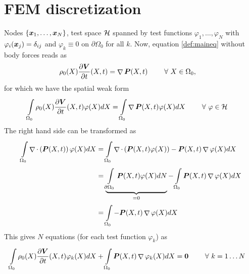 \documentclass[a4paper,12pt]{article}
\newcommand{\Or}{\Omega_0}
\newcommand{\intor}{\intl{\Or}{}}
\newcommand{\intorb}{\intl{\partial\Or}{}}
\DeclareMathOperator{\divergence}{\nabla}
\renewcommand{\div}[1]{\divergence\cdot\left(#1\right)}
\begin{document}
\section{FEM discretization}
Nodes $\{\boldsymbol{x}_1,\ldots,\boldsymbol{x}_N\}$, test space $\mathcal{H}$ spanned by test functions
$\varphi_1,\ldots,\varphi_N$ with $\varphi_i(\boldsymbol{x}_j) = \delta_{ij}$ and $\varphi_k \equiv 0$ on $\partial\Or$ for all $k$.
Now, equation \eqref{def:maineq} without body forces reads as 
\begin{align}
	\rho_0(X)\d{\vV}{t}(X,t) &= \divergence\vP(X,t) \qquad \fo X\in\Or,
\end{align}
for which we have the spatial weak form
\begin{align}
	\intor\rho_0(X)\d{\vV}{t}(X,t)\varphi(X)dX &= \intor\divergence\vP(X,t)\varphi(X)dX \qquad\fo \varphi\in\H
\end{align}
The right hand side can be transformed as
\begin{align*}
	\intor \div{\vP(X,t)}\varphi(X) dX &= \intor \div{\vP(X,t)\varphi(X)} - \vP(X,t)\divergence\varphi(X) dX\\
		 &= \underbrace{\intorb \vP(X,t)\varphi(X) dN}_{=0} - \intor \vP(X,t)\divergence\varphi(X)dX\\
		 &= \intor -\vP(X,t)\divergence\varphi(X) dX
\end{align*}
This gives $N$ equations (for each test function $\varphi_k$) as
\begin{align}
	\intor \rho_0(X)\d{\vV}{t}(X,t)\varphi_k(X)dX + \intor\vP(X,t)\divergence\varphi_k(X) dX &= \vnull\qquad \fo k=1\ldots N\label{def:weakform}
\end{align}
\end{document}
